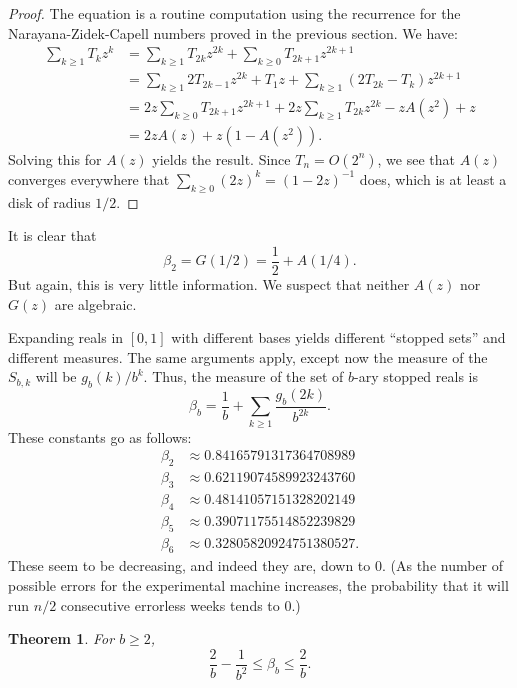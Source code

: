 \documentclass[12pt]{amsart}
\newtheorem{theorem}{Theorem}
\theoremstyle{definition}
\begin{document}
\begin{proof}
    The equation is a routine computation using the recurrence for the Narayana-Zidek-Capell numbers proved in
    the previous section. We have:
    \begin{align*}
        \sum_{k \geq 1} T_k z^k
            &= \sum_{k \geq 1} T_{2k} z^{2k} + \sum_{k \geq 0} T_{2k+1} z^{2k + 1} \\
            &= \sum_{k \geq 1} 2 T_{2k-1} z^{2k} + T_1 z + \sum_{k \geq 1} (2T_{2k} - T_k) z^{2k + 1} \\
            &= 2 z \sum_{k \geq 0} T_{2k+1} z^{2k + 1} + 2 z \sum_{k \geq 1} T_{2k} z^{2k} - z A(z^2) + z \\
            &= 2z A(z) + z(1 - A(z^2)).
    \end{align*}
    Solving this for $A(z)$ yields the result. Since $T_n =
    O(2^n)$, we see that $A(z)$ converges everywhere that $\sum_{k \geq 0} (2z)^k = (1 -
    2z)^{-1}$ does, which is at least a disk of radius $1/2$.
\end{proof}

It is clear that
\begin{equation*}
    \beta_2 = G(1/2) =\frac{1}{2} + A(1/4).
\end{equation*}
But again, this is very little information. We suspect that neither $A(z)$ nor
$G(z)$ are algebraic.

Expanding reals in $[0, 1]$ with different bases yields different ``stopped
sets'' and different measures. The same arguments apply, except now the measure
of the $S_{b,k}$ will be $g_b(k) / b^k$. Thus, the measure of the set of $b$-ary
stopped reals is
\begin{equation*}
    \beta_b = \frac{1}{b} + \sum_{k \geq 1} \frac{g_b(2k)}{b^{2k}}.
\end{equation*}
These constants go as follows:
\begin{align*}
    \beta_2 &\approx 0.84165791317364708989 \\
    \beta_3 &\approx 0.62119074589923243760 \\
    \beta_4 &\approx 0.48141057151328202149 \\
    \beta_5 &\approx 0.39071175514852239829 \\
    \beta_6 &\approx 0.32805820924751380527.
\end{align*}
These seem to be decreasing, and indeed they are, down to 0.
(As the number of possible errors for the experimental machine increases, the probability
that it will run $n/2$ consecutive errorless weeks tends to 0.)
\begin{theorem}
    For $b \geq 2$,
    \begin{equation*}
        \frac{2}{b} - \frac{1}{b^2} \leq \beta_b \leq \frac{2}{b}.
    \end{equation*}
\end{theorem}
\end{document}
